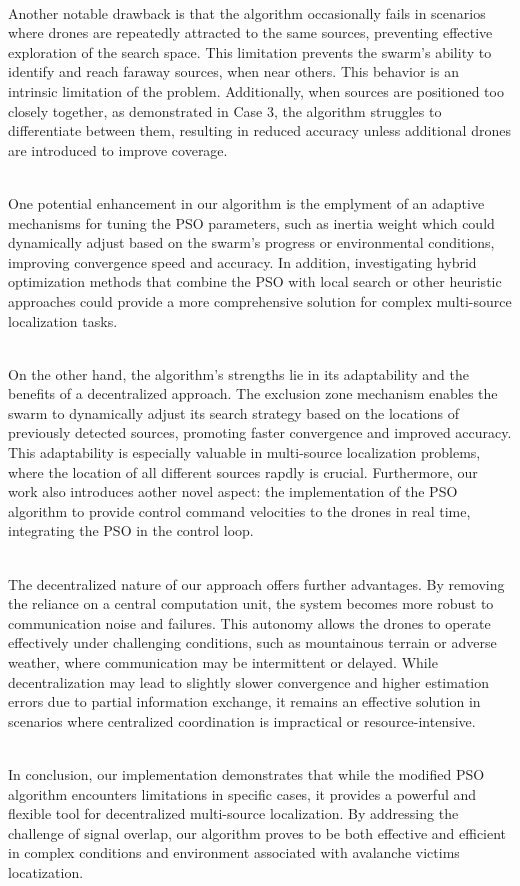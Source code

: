 \noindent\\
Another notable drawback is that the algorithm occasionally fails in
scenarios where drones are repeatedly attracted to the same sources,
preventing effective exploration of the search space. This limitation
prevents the swarm's ability to identify and reach faraway
sources, when near others. This behavior is an intrinsic limitation of 
the problem. Additionally, when sources
are positioned too closely together, as demonstrated in Case 3, the
algorithm struggles to differentiate between them, resulting in reduced
accuracy unless additional drones are introduced to improve coverage.

\noindent\\
One potential enhancement in our algorithm is the emplyment of an adaptive mechanisms 
for tuning the PSO parameters, such as inertia weight 
which could dynamically adjust based on the swarm's progress or environmental 
conditions, improving convergence speed and accuracy.
In addition, investigating hybrid optimization methods that combine 
the PSO with local search or other heuristic approaches could provide a more 
comprehensive solution for complex multi-source localization tasks.

\noindent\\
On the other hand, the algorithm's strengths lie in its adaptability and
the benefits of a decentralized approach. The exclusion zone mechanism
enables the swarm to dynamically adjust its search strategy based on the
locations of previously detected sources, promoting faster convergence
and improved accuracy. This adaptability is especially valuable in
multi-source localization problems, where the location of all different
sources rapdly is crucial.
Furthermore, our work also introduces aother novel aspect: 
the implementation of the PSO algorithm to provide control command velocities 
to the drones in real time, integrating the PSO in the control
loop.

\noindent\\
The decentralized nature of our approach offers further advantages. By
removing the reliance on a central computation unit, the system becomes
more robust to communication noise and failures. This autonomy allows
the drones to operate effectively under challenging conditions, such as
mountainous terrain or adverse weather, where communication may be
intermittent or delayed. While decentralization may lead to slightly
slower convergence and higher estimation errors due to partial
information exchange, it remains an effective solution in scenarios
where centralized coordination is impractical or resource-intensive.

\noindent\\
In conclusion, our implementation demonstrates that while the modified PSO
algorithm encounters limitations in specific cases, it provides a
powerful and flexible tool for decentralized multi-source localization.
By addressing the challenge of signal overlap, our algorithm proves to be
both effective and efficient in complex conditions and environment associated
with avalanche victims locatization.